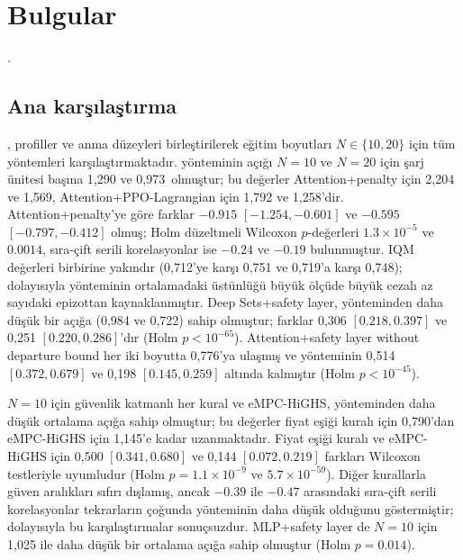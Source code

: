 \section{Bulgular}\label{sec:results}

.

\subsection{Ana karşılaştırma}\label{sec:res-main}

, profiller ve anma düzeyleri birleştirilerek eğitim boyutları $N\in\{10,20\}$ için tüm yöntemleri karşılaştırmaktadır.
\method{} yönteminin açığı $N=10$ ve $N=20$ için şarj ünitesi başına 1,290 ve 0,973\,\texteuro{} olmuştur; bu değerler Attention+penalty için 2,204 ve 1,569, Attention+PPO-Lagrangian için 1,792 ve 1,258'dir.
Attention+penalty'ye göre farklar $-0.915$ $[-1.254,-0.601]$ ve $-0.595$ $[-0.797,-0.412]$ olmuş; Holm düzeltmeli Wilcoxon $p$-değerleri $1.3\times10^{-5}$ ve $0.0014$, sıra-çift serili korelasyonlar ise $-0.24$ ve $-0.19$ bulunmuştur.
IQM değerleri birbirine yakındır (0,712'ye karşı 0,751 ve 0,719'a karşı 0,748); dolayısıyla \method{} yönteminin ortalamadaki üstünlüğü büyük ölçüde büyük cezalı az sayıdaki epizottan kaynaklanmıştır.
Deep Sets+safety layer, \method{} yönteminden daha düşük bir açığa (0,984 ve 0,722) sahip olmuştur; farklar 0,306 $[0.218,0.397]$ ve 0,251 $[0.220,0.286]$'dır (Holm $p<10^{-65}$).
Attention+safety layer without departure bound her iki boyutta 0,776'ya ulaşmış ve \method{} yönteminin 0,514 $[0.372,0.679]$ ve 0,198 $[0.145,0.259]$ altında kalmıştır (Holm $p<10^{-45}$).

$N=10$ için güvenlik katmanlı her kural ve eMPC-HiGHS, \method{} yönteminden daha düşük ortalama açığa sahip olmuştur; bu değerler fiyat eşiği kuralı için 0,790'dan eMPC-HiGHS için 1,145'e kadar uzanmaktadır.
Fiyat eşiği kuralı ve eMPC-HiGHS için 0,500 $[0.341,0.680]$ ve 0,144 $[0.072,0.219]$ farkları Wilcoxon testleriyle uyumludur (Holm $p=1.1\times10^{-9}$ ve $5.7\times10^{-59}$).
Diğer kurallarla güven aralıkları sıfırı dışlamış, ancak $-0.39$ ile $-0.47$ arasındaki sıra-çift serili korelasyonlar tekrarların çoğunda \method{} yönteminin daha düşük olduğunu göstermiştir; dolayısıyla bu karşılaştırmalar sonuçsuzdur.
MLP+safety layer de $N=10$ için 1,025 ile daha düşük bir ortalama açığa sahip olmuştur (Holm $p=0.014$).

